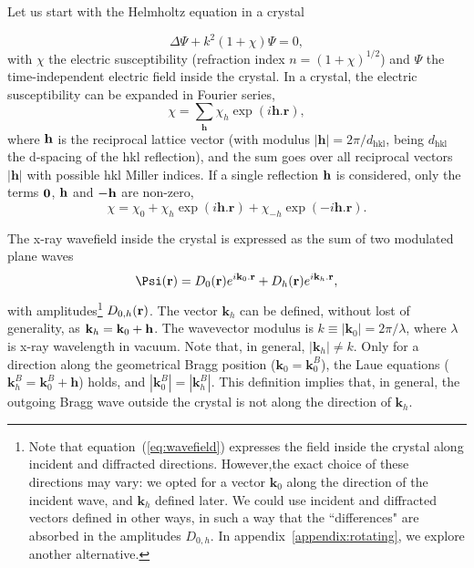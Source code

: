\documentclass[preprint]{iucr}              %
\begin{document}
Let us start with the Helmholtz equation in a crystal

\begin{equation}
\label{eq:helmholz}
    \Delta \Psi + k^2 (1+\chi) \Psi = 0,
\end{equation}
with $\chi$ the electric susceptibility (refraction index $n=(1+\chi)^{1/2}$) and $\Psi$ the time-independent electric field inside the crystal. In a crystal, the electric susceptibility can be expanded in Fourier series,
\begin{equation}
\label{eq:chi}
    \chi = \sum_{\textbf{h}} \chi_h \exp(i \textbf{h} . \textbf{r}),
\end{equation}
where $\bf{h}$ is the reciprocal lattice vector (with modulus $|\textbf{h}|=2\pi/d_\text{hkl}$, being $d_\text{hkl}$ the d-spacing of the hkl reflection), and the sum goes over all reciprocal vectors $|\textbf{h}|$ with possible hkl Miller indices. If a single reflection $\bf{h}$ is considered, only the terms $\bf{0}$, $\bf{h}$ and $\bf{-h}$ are non-zero, 
\begin{equation}
\label{eq:chisimple}
    \chi = \chi_0 + \chi_{h} \exp(i \textbf{h} . \textbf{r}) + \chi_{-h} \exp(-i \textbf{h} . \textbf{r}).
\end{equation}

The x-ray wavefield inside the crystal is expressed as the sum of two modulated plane waves
\begin{equation}
\label{eq:wavefield}
    \Psi(\textbf r) = D_0(\textbf r) e^{i \textbf k_0 . \textbf r} + D_h(\textbf r) e^{i \textbf k_h . \textbf r},
\end{equation}
with amplitudes\footnote{
Note that equation~(\ref{eq:wavefield}) expresses the field inside the crystal along incident and diffracted directions. However,the exact choice of  these directions may vary: we opted for a vector $\textbf{k}_0$ along the direction of the incident wave, and $\textbf{k}_h$ defined later. We could use incident and diffracted vectors defined in other ways, in such a way that the ``differences" are absorbed in the amplitudes $D_{0,h}$. In appendix~\ref{appendix:rotating}, we explore another alternative.
} $D_{0,h}(\textbf r)$.
The vector $\textbf{k}_h$ can be defined, without lost of generality, as $\textbf k_h=\textbf k_0 + \textbf h$. 
The wavevector modulus is $k \equiv |\textbf{k}_0|=2\pi/\lambda$, where $\lambda$ is x-ray wavelength in vacuum. Note that, in general, $ |\textbf{k}_h| \ne k$. Only for a direction along the geometrical Bragg position ($\textbf{k}_0=\textbf{k}_0^B$), the Laue equations ($\textbf{k}_h^B=\textbf{k}_0^B+\textbf{h}$) holds, and $|\textbf{k}_0^B|=|\textbf{k}_h^B|$. This definition implies that, in general, the outgoing Bragg wave outside the crystal is not along the direction of $\textbf{k}_h$.
\end{document}
